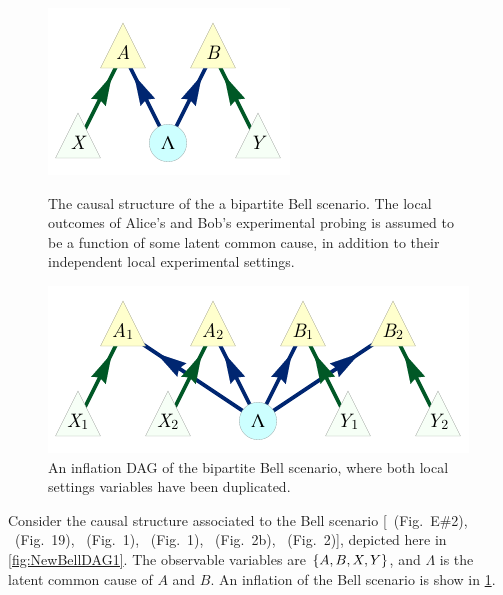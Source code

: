{\par\smallskip\nobreak

\begin{figure}[b]
\centering
\begin{minipage}[t]{0.45\linewidth}
\centering
\includegraphics[scale=1]{BellDagRaw.pdf}
\caption{The causal structure of the a bipartite Bell scenario. The local outcomes of Alice's and Bob's experimental probing is assumed to be a function of some latent common cause, in addition to their independent local experimental settings.}\label{fig:NewBellDAG1}
\end{minipage}
\hfill
\begin{minipage}[t]{0.45\linewidth}
\centering
\includegraphics[scale=1]{BellDagCopy.pdf}
\caption{An inflation DAG of the bipartite Bell scenario, where both local settings variables have been duplicated.}\label{fig:BellDagCopy1}
\end{minipage}
\end{figure}

Consider the causal structure associated to the Bell \cite{bell1964einstein,Brunner2013Bell,bell1966lhvm,CHSHOriginal} scenario [\citealp{pusey2014gdag}~(Fig.~E\#2), \citealp{WoodSpekkens}~(Fig.~19), \citealp{chaves2014novel}~(Fig.~1), \citealp{BeyondBellII}~(Fig.~1), \citealp{wolfe2015nonconvexity}~(Fig.~2b), \citealp{steeg2011relaxation}~(Fig.~2)], depicted here in \cref{fig:NewBellDAG1}. The observable variables are $\left\lbrace A,B,X,Y\right\rbrace$, and $\Lambda$ is the latent common cause of $A$ and $B$. An inflation of the Bell scenario is show in \cref{fig:BellDagCopy1}.

}
